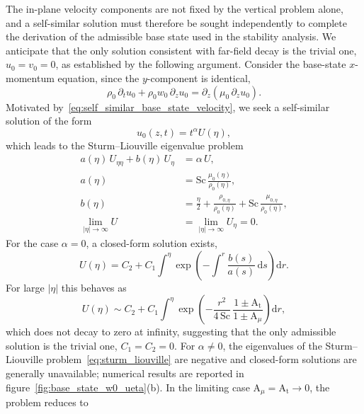 \documentclass[11pt]{article}
\newcommand{\Atw}{\mathrm{A_t}}
\newcommand{\Sch}{\mathrm{Sc}}
\newcommand{\Amu}{\mathrm{A}_{\mu}}
\begin{document}
The in-plane velocity components are not fixed by the vertical problem alone, and a self-similar solution must therefore be sought independently to complete the derivation of the admissible base state used in the stability analysis. We anticipate that the only solution consistent with far-field decay is the trivial one, \(u_0 = v_0 = 0\), as established by the following argument. Consider the base-state \(x\)-momentum equation, since the \(y\)-component is identical,
\begin{equation}
    \rho_0\,\partial_t u_0 + \rho_0 w_0\,\partial_z u_0 = \partial_z\left(\mu_0\,\partial_z u_0\right).
\end{equation}
Motivated by~\eqref{eq:self_similar_base_state_velocity}, we seek a self-similar solution of the form
\begin{equation}
    u_0(z,t) = t^{\alpha} U(\eta),
\end{equation}
which leads to the Sturm--Liouville eigenvalue problem
\begin{subequations}
\label{eq:sturm_liouville}
\begin{align}
    a(\eta)\,U_{\eta\eta} + b(\eta)\,U_{\eta} &= \alpha\,U, \\
    a(\eta) &= \Sch\,\frac{\mu_0(\eta)}{\rho_0(\eta)}, \\
    b(\eta) &= \frac{\eta}{2} + \frac{\rho_{0,\eta}}{\rho_0(\eta)} + \Sch\,\frac{\mu_{0,\eta}}{\rho_0(\eta)}, \\
    \lim_{|\eta|\to\infty} U &= \lim_{|\eta|\to\infty} U_{\eta} = 0.
\end{align}
\end{subequations}
For the case \(\alpha = 0\), a closed-form solution exists,
\begin{equation}
    U(\eta) = C_2 + C_1 \int^\eta \exp\!\left(-\int^r \frac{b(s)}{a(s)}\,\mathrm{d}s\right)\mathrm{d}r.
\end{equation}
For large \(|\eta|\) this behaves as
\begin{equation}
    U(\eta) \sim C_2 + C_1 \int^\eta \exp\!\left(-\frac{r^2}{4\,\Sch}\,\frac{1\pm\Atw}{1\pm\Amu}\right)\mathrm{d}r,
\end{equation}
which does not decay to zero at infinity, suggesting that the only admissible solution is the trivial one, \(C_1 = C_2 = 0\). For \(\alpha \neq 0\), the eigenvalues of the Sturm--Liouville problem~\eqref{eq:sturm_liouville} are negative and closed-form solutions are generally unavailable; numerical results are reported in figure~\ref{fig:base_state_w0_ueta}(b). In the limiting case \(\mathrm{A}_{\mu} = \Atw \to 0\), the problem reduces to
\end{document}
